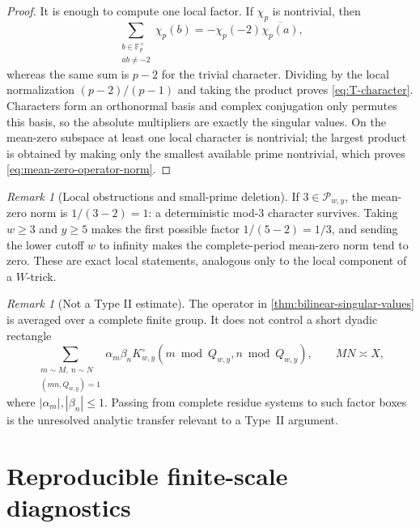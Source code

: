\documentclass[11pt]{article}
\theoremstyle{definition}
\theoremstyle{remark}
\newtheorem{remark}[theorem]{Remark}
\newcommand{\F}{\mathbb F}
\newcommand{\cP}{\mathcal P}
\begin{document}
\begin{proof}
It is enough to compute one local factor.  If $\chi_p$ is nontrivial, then
\[
 \sum_{\substack{b\in\F_p^\times\\ab\ne-2}}\chi_p(b)
 =-\chi_p(-2)\overline{\chi_p(a)},
\]
whereas the same sum is $p-2$ for the trivial character.  Dividing by the local normalization $(p-2)/(p-1)$ and taking the product proves \eqref{eq:T-character}.  Characters form an orthonormal basis and complex conjugation only permutes this basis, so the absolute multipliers are exactly the singular values.  On the mean-zero subspace at least one local character is nontrivial; the largest product is obtained by making only the smallest available prime nontrivial, which proves \eqref{eq:mean-zero-operator-norm}.
\end{proof}

\begin{remark}[Local obstructions and small-prime deletion]\label{rem:local-obstruction}
If $3\in\cP_{w,y}$, the mean-zero norm is $1/(3-2)=1$: a deterministic mod-$3$ character survives.  Taking $w\ge3$ and $y\ge5$ makes the first possible factor $1/(5-2)=1/3$, and sending the lower cutoff $w$ to infinity makes the complete-period mean-zero norm tend to zero.  These are exact local statements, analogous only to the local component of a $W$-trick.
\end{remark}

\begin{remark}[Not a Type II estimate]\label{rem:not-type-II}
The operator in \cref{thm:bilinear-singular-values} is averaged over a complete finite group.  It does not control a short dyadic rectangle
\begin{equation}\label{eq:type-II-box}
 \sum_{\substack{m\sim M,\ n\sim N\\(mn,Q_{w,y})=1}}
 \alpha_m\beta_n
 K_{w,y}^{\circ}(m\bmod Q_{w,y},n\bmod Q_{w,y}),
 \qquad MN\asymp X,
\end{equation}
where $|\alpha_m|,|\beta_n|\le1$.  Passing from complete residue systems to such factor boxes is the unresolved analytic transfer relevant to a Type~II argument.
\end{remark}

\section{Reproducible finite-scale diagnostics}\label{sec:numerics}
\end{document}
